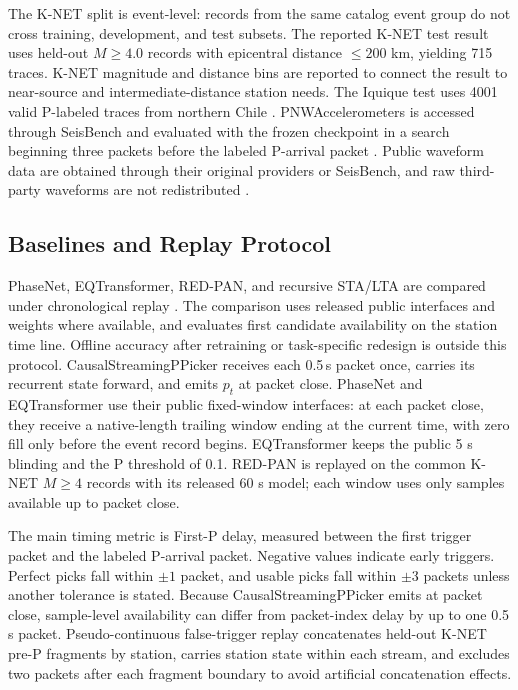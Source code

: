 \documentclass[journal]{IEEEtran}
\newcommand{\modelv}{CausalStreamingPPicker\xspace}
\newcommand{\chunk}{0.5\,s\xspace}
\begin{document}
The K-NET split is event-level: records from the same catalog event group do not cross training, development, and test subsets. The reported K-NET test result uses held-out $M\geq4.0$ records with epicentral distance $\leq200$ km, yielding 715 traces. K-NET magnitude and distance bins are reported to connect the result to near-source and intermediate-distance station needs. The Iquique test uses 4001 valid P-labeled traces from northern Chile \cite{woollam2019iquique,woollam2022seisbench}. PNWAccelerometers is accessed through SeisBench and evaluated with the frozen checkpoint in a search beginning three packets before the labeled P-arrival packet \cite{woollam2022seisbench}. Public waveform data are obtained through their original providers or SeisBench, and raw third-party waveforms are not redistributed \cite{michelini2021instance,aoi2004knet,nied2019knet,sarkar2022japan}.

\subsection{Baselines and Replay Protocol}
PhaseNet, EQTransformer, RED-PAN, and recursive STA/LTA are compared under chronological replay \cite{zhu2019phasenet,mousavi2020earthquake,liao2022redpan,woollam2022seisbench}. The comparison uses released public interfaces and weights where available, and evaluates first candidate availability on the station time line. Offline accuracy after retraining or task-specific redesign is outside this protocol. \modelv{} receives each \chunk packet once, carries its recurrent state forward, and emits $p_t$ at packet close. PhaseNet and EQTransformer use their public fixed-window interfaces: at each packet close, they receive a native-length trailing window ending at the current time, with zero fill only before the event record begins. EQTransformer keeps the public 5 s blinding and the P threshold of 0.1. RED-PAN is replayed on the common K-NET $M\geq4$ records with its released 60 s model; each window uses only samples available up to packet close.

The main timing metric is First-P delay, measured between the first trigger packet and the labeled P-arrival packet. Negative values indicate early triggers. Perfect picks fall within $\pm1$ packet, and usable picks fall within $\pm3$ packets unless another tolerance is stated. Because \modelv{} emits at packet close, sample-level availability can differ from packet-index delay by up to one \chunk packet. Pseudo-continuous false-trigger replay concatenates held-out K-NET pre-P fragments by station, carries station state within each stream, and excludes two packets after each fragment boundary to avoid artificial concatenation effects.
\end{document}
